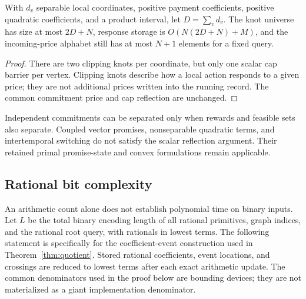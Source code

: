\begin{corollary}\label{cor:coordinates}
With $d_v$ separable local coordinates, positive payment coefficients, positive quadratic coefficients, and a product interval, let $D=\sum_vd_v$. The knot universe has size at most $2D+N$, response storage is $O(N(2D+N)+M)$, and the incoming-price alphabet still has at most $N+1$ elements for a fixed query.
\end{corollary}
\begin{proof}
There are two clipping knots per coordinate, but only one scalar cap barrier per vertex. Clipping knots describe how a local action responds to a given price; they are not additional prices written into the running record. The common commitment price and cap reflection are unchanged.
\end{proof}
Independent commitments can be separated only when rewards and feasible sets also separate. Coupled vector promises, nonseparable quadratic terms, and intertemporal switching do not satisfy the scalar reflection argument. Their retained primal promise-state and convex formulations remain applicable.

\subsection{Rational bit complexity}\label{sec:bit}
An arithmetic count alone does not establish polynomial time on binary inputs. Let $L$ be the total binary encoding length of all rational primitives, graph indices, and the rational root query, with rationals in lowest terms. The following statement is specifically for the coefficient-event construction used in Theorem~\ref{thm:quotient}. Stored rational coefficients, event locations, and crossings are reduced to lowest terms after each exact arithmetic update. The common denominators used in the proof below are bounding devices; they are not materialized as a giant implementation denominator.

